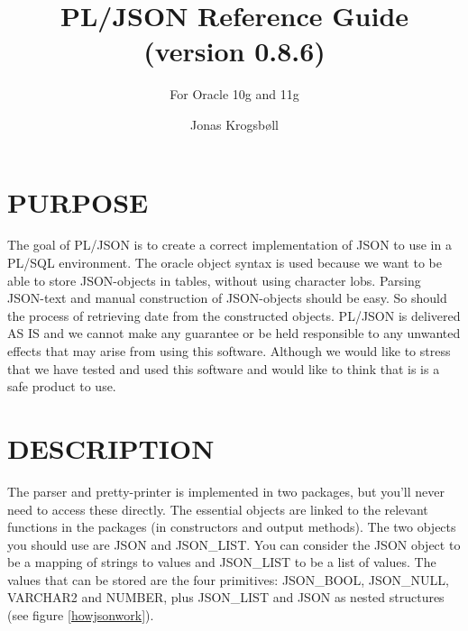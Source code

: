\documentclass[11pt,twocolumn, a4paper]{article}
\title{PL/JSON Reference Guide (version 0.8.6)}
\subtitle{For Oracle 10g and 11g}
\author{Jonas Krogsbøll}
\date{}
\begin{document}
\maketitle

\section*{PURPOSE}
The goal of PL/JSON is to create a correct implementation of JSON to use in a PL/SQL environment. The oracle object syntax is used because we want to be able to store JSON-objects in tables, without using character lobs. Parsing JSON-text and manual construction of JSON-objects should be easy. So should the process of retrieving date from the constructed objects. PL/JSON is delivered AS IS and we cannot make any guarantee or be held responsible to any unwanted effects that may arise from using this software. Although we would like to stress that we have tested and used this software and would like to think that is is a safe product to use.

\section*{DESCRIPTION}
The parser and pretty-printer is implemented in two packages, but you'll never need to access these directly. The essential objects are linked to the relevant functions in the packages (in constructors and output methods). The two objects you should use are JSON and JSON\_LIST. You can consider the JSON object to be a mapping of strings to values and JSON\_LIST to be a list of values. The values that can be stored are the four primitives: JSON\_BOOL, JSON\_NULL, VARCHAR2 and NUMBER, plus JSON\_LIST and JSON as nested structures (see figure \ref{howjsonwork}).
\end{document}
